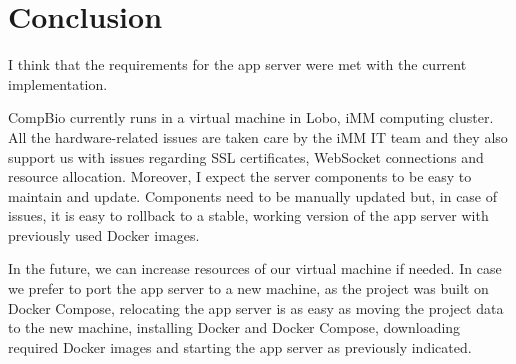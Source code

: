 
\section{Conclusion}

I think that the requirements for the app server were met with the current implementation.

CompBio currently runs in a virtual machine in Lobo, iMM computing cluster. All the hardware-related issues are taken care by the iMM IT team and they also support us with issues regarding SSL certificates, WebSocket connections and resource allocation. Moreover, I expect the server components to be easy to maintain and update. Components need to be manually updated but, in case of issues, it is easy to rollback to a stable, working version of the app server with previously used Docker images.

In the future, we can increase resources of our virtual machine if needed. In case we prefer to port the app server to a new machine, as the project was built on Docker Compose, relocating the app server is as easy as moving the project data to the new machine, installing Docker and Docker Compose, downloading required Docker images and starting the app server as previously indicated.

